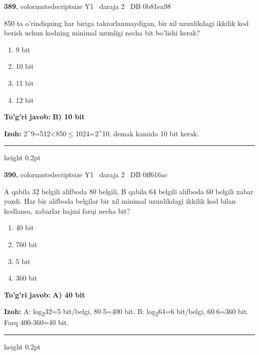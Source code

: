 \documentclass[10pt,a4paper,oneside]{article}
\begin{document}
\noindent\textbf{\color{ink}389.}  {color{muted}scriptsize Y1 \textbullet\ daraja 2 \textbullet\ DB 0b81ea98}
\par
850 ta o'rindiqning har biriga takrorlanmaydigan, bir xil uzunlikdagi ikkilik kod berish uchun kodning minimal uzunligi necha bit bo'lishi kerak?
\begin{enumerate}[label=\Alph*),leftmargin=9mm]
\item 9 bit
\item 10 bit
\item 11 bit
\item 12 bit
\end{enumerate}
\begin{tcolorbox}[enhanced,breakable,colback=teal!4,colframe=teal!50!black,boxrule=0.5pt,arc=1.1mm,left=3mm,right=3mm,top=1.7mm,bottom=1.7mm,before skip=2mm,after skip=2mm]
\textbf{\color{teal}To'g'ri javob:} \textbf{B) 10 bit}
\par\smallskip
\textbf{Izoh:} 2\textasciicircum{}9=512\textless{}850\ensuremath{\leq}1024=2\textasciicircum{}10, demak kamida 10 bit kerak.
\end{tcolorbox}
\vspace{2mm}\hrule height 0.2pt \vspace{3mm}

\noindent\textbf{\color{ink}390.}  {color{muted}scriptsize Y1 \textbullet\ daraja 2 \textbullet\ DB 0ff616ac}
\par
A qabila 32 belgili alifboda 80 belgili, B qabila 64 belgili alifboda 60 belgili xabar yozdi. Har bir alifboda belgilar bir xil minimal uzunlikdagi ikkilik kod bilan kodlansa, xabarlar hajmi farqi necha bit?
\begin{enumerate}[label=\Alph*),leftmargin=9mm]
\item 40 bit
\item 760 bit
\item 5 bit
\item 360 bit
\end{enumerate}
\begin{tcolorbox}[enhanced,breakable,colback=teal!4,colframe=teal!50!black,boxrule=0.5pt,arc=1.1mm,left=3mm,right=3mm,top=1.7mm,bottom=1.7mm,before skip=2mm,after skip=2mm]
\textbf{\color{teal}To'g'ri javob:} \textbf{A) 40 bit}
\par\smallskip
\textbf{Izoh:} A: log\textsubscript{2}32=5 bit/belgi, 80\ensuremath{\cdot}5=400 bit. B: log\textsubscript{2}64=6 bit/belgi, 60\ensuremath{\cdot}6=360 bit. Farq 400-360=40 bit.
\end{tcolorbox}
\vspace{2mm}\hrule height 0.2pt \vspace{3mm}
\end{document}
